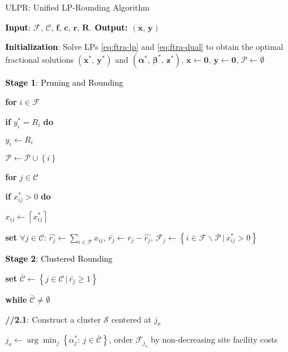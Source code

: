 \documentclass[10pt]{llncs}
\begin{document}
\begin{algorithm}[H]
\caption{ULPR: Unified LP-Rounding Algorithm}


\textbf{\textcolor{black}{Input}}\textcolor{black}{: }$\mathcal{F},\,\mathcal{C},\,\boldsymbol{f},\,\boldsymbol{c},\,\boldsymbol{r},\,\boldsymbol{R}$.\textbf{\textcolor{black}{{}
Output: }}$\left(\boldsymbol{x},\,\boldsymbol{y}\right)$

\textbf{\textcolor{black}{Initialization}}\textcolor{black}{: }Solve
LPs \eqref{eq:ftra-lp} and \eqref{eq:ftra-dual} to obtain the optimal
fractional solutions $\left(\boldsymbol{x^{*}},\,\boldsymbol{y^{*}}\right)$
and $\left(\boldsymbol{\alpha^{*}},\,\boldsymbol{\beta^{*}},\,\boldsymbol{z^{*}}\right)$.
$\boldsymbol{x}\leftarrow\boldsymbol{0},\,\boldsymbol{y}\leftarrow\boldsymbol{0},\,\mathcal{P}\leftarrow\emptyset$

\textbf{\textcolor{black}{Stage 1}}\textcolor{black}{: Pruning and
Rounding}

\textbf{for} $i\in\mathcal{F}$

\qquad{}\textbf{if} $y_{i}^{*}=R_{i}$ \textbf{do}

\qquad{}\qquad{}$y_{i}\leftarrow R_{i}$

\qquad{}\qquad{}$\mathcal{P}\leftarrow\mathcal{P}\cup\left\{ i\right\} $

\qquad{}\qquad{}\textbf{for} $j\in\mathcal{C}$ 

\qquad{}\qquad{}\qquad{}\textbf{if} $x{}_{ij}^{*}>0$ \textbf{do}

\qquad{}\qquad{}\qquad{}\qquad{}$x_{ij}\leftarrow\left\lceil x_{ij}^{*}\right\rceil $

\textbf{set} $\forall j\in\mathcal{C}:\,\hat{r_{j}}\leftarrow\sum_{i\in\mathcal{P}}x_{ij},\,\bar{r_{j}}\leftarrow r_{j}-\hat{r_{j}},\,\mathcal{F}_{j}\leftarrow\left\{ i\in\mathcal{F}\backslash\mathcal{P}\,|\, x_{ij}^{*}>0\right\} $

\medskip{}


\textbf{\textcolor{black}{Stage 2}}\textcolor{black}{: Clustered Rounding}

\textbf{set} $\bar{\mathcal{C}}\leftarrow\left\{ j\in\mathcal{C}\,|\,\bar{r_{j}}\geq1\right\} $

\textbf{while }$\bar{\mathcal{C}}\neq\emptyset$

\qquad{}\textbf{//2.1}: Construct a cluster $\mathcal{S}$ centered
at $j_{o}$

\qquad{}$j_{o}\leftarrow\arg\min_{j}\left\{ \alpha_{j}^{*}:\, j\in\bar{\mathcal{C}}\right\} $,
order $\mathcal{F}_{j_{o}}$ by non-decreasing site facility costs


\end{algorithm}
\end{document}
